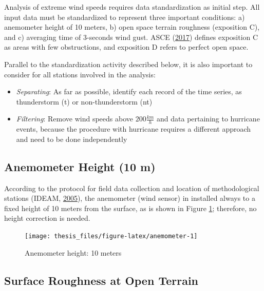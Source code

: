 \documentclass[12pt,twoside]{reedthesis}
\begin{document}
Analysis of extreme wind speeds requires data standardization as initial step. All input data must be standardized to represent three important conditions: a) anemometer height of 10 meters, b) open space terrain roughness (exposition C), and c) averaging time of 3-seconds wind gust. ASCE (\protect\hyperlink{ref-Asce2017}{2017}) defines exposition C as areas with few obstructions, and exposition D refers to perfect open space.

Parallel to the standardization activity described below, it is also important to consider for all stations involved in the analysis:
\begin{itemize}
\item
  \emph{Separating}: As far as possible, identify each record of the time series, as thunderstorm (t) or non-thunderstorm (nt)
\item
  \emph{Filtering}: Remove wind speeds above \(200 \frac{km}{h}\) and data pertaining to hurricane events, because the procedure with hurricane requires a different approach and need to be done independently
\end{itemize}
\hypertarget{anemometer-height-10-m}{%
\subsection{Anemometer Height (10 m)}\label{anemometer-height-10-m}}

According to the protocol for field data collection and location of methodological stations (IDEAM, \protect\hyperlink{ref-ideam2005}{2005}), the anemometer (wind sensor) in installed always to a fixed height of 10 meters from the surface, as is shown in Figure \ref{fig:anemometer}; therefore, no height correction is needed.
\begin{figure}

{\centering \texttt{[image: thesis\_files/figure-latex/anemometer-1]} 

}

\caption{Anemometer height: 10 meters}\label{fig:anemometer}
\end{figure}
\hypertarget{rmd-roughness}{%
\subsection{Surface Roughness at Open Terrain}\label{rmd-roughness}}
\end{document}
